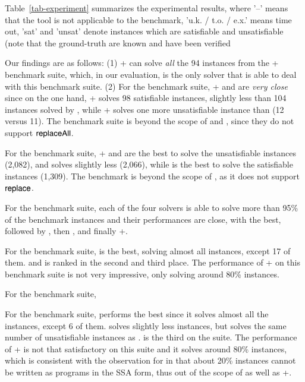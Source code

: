 Table~\ref{tab-experiment} summarizes the experimental results, where '--' means that the tool is not applicable to the benchmark, 'u.k. / t.o. / e.x.' means time out,  'sat' and 'unsat' denote instances which are satisfiable and unsatisfiable (note that the ground-truth are known and have been verified   

Our findings are as follows: (1) {\ostrich}+ can solve  \emph{all} the 94 instances from the {\transducerbench}+ benchmark suite, which, in our evaluation, is the only solver that is able to deal with this benchmark suite. (2) For the {\slogbenchra} benchmark suite, {\ostrich}+ and {\cvc} are \emph{very close} since on the one hand, {\ostrich}+ solves 98 satisfiable instances, slightly less than 104 instances solved by {\cvc}, while {\ostrich}+ solves one more unsatisfiable instance than {\cvc} (12 versus 11). The {\slogbenchra} benchmark suite is beyond the scope of {\zthree} and {\zthreetrau}, since they do not support $\mathsf{replaceAll}$.

For the {\slogbenchr} benchmark suite, {\ostrich}+ and {\cvc} are the best to solve the unsatisfiable instances (2,082), and {\zthree} solves slightly less (2,066),  
while {\cvc} is the best to solve the satisfiable instances (1,309). The {\slogbenchr} benchmark is beyond the scope of {\zthreetrau}, as it does not support $\mathsf{replace}$.

For the {\pyextdbench} benchmark suite, each of the four solvers is able to solve more than 95\% of the benchmark instances and their performances are close, with {\zthreetrau} the best, followed by {\cvc}, then {\zthree}, and finally {\ostrich}+.  

For the {\pyexztbench} benchmark suite, {\zthreetrau} is the best, solving almost all instances, except 17 of them. {\cvc} and {\zthree} is ranked in the second and third place. The performance of {\ostrich}+ on this benchmark suite is not very impressive, only solving around 80\% instances.

For the {\pyexzzbench} benchmark suite, 

For the {\kaluzabench} benchmark suite, {\cvc} performs the best since it solves almost all the instances, except 6 of them. {\zthreetrau} solves slightly less instances, but solves the same number of unsatisfiable instances as {\cvc}. {\zthree} is the third on the {\kaluzabench} suite. The performance of {\ostrich}+ is not that satisfactory on this suite and it  solves  around 80\%  instances, which is consistent with the observation for {\ostrich} in \cite{CHL+19} that about 20\% {\kaluzabench} instances cannot be written as programs in the SSA form, thus out of the scope of {\ostrich} as well as {\ostrich}+.

